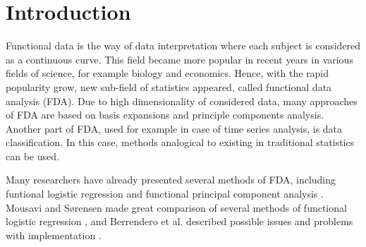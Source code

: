 \documentclass[energies,article,submit,pdftex,moreauthors]{Definitions/mdpi}
\begin{document}




\section{Introduction}

Functional data is the way of data interpretation where each subject is considered as a continuous curve. This field became more popular in recent years in various fields of science, for example biology and economics. Hence, with the rapid popularity grow, new sub-field of statistics appeared, called functional data analysis (FDA). Due to high dimensionality of considered data, many approaches of FDA are based on basis expansions and principle components analysis. Another part of FDA, used for example in case of time series analysis, is data classification. In this case, methods analogical to existing in traditional statistics can be used. 

Many researchers have already presented several methods of FDA, including funtional logistic regression \cite{ramsay-logreg, ramsay-logreg2, ramsay1982data} and functional principal component analysis \cite{besse-pca, pezzulini-pca}. Mousavi and Sørensen made great comparison of several methods of functional logistic regression \cite{logreg-comparison}, and Berrendero et al. described possible issues and problems with implementation \cite{logreg-issues}.
\end{document}
